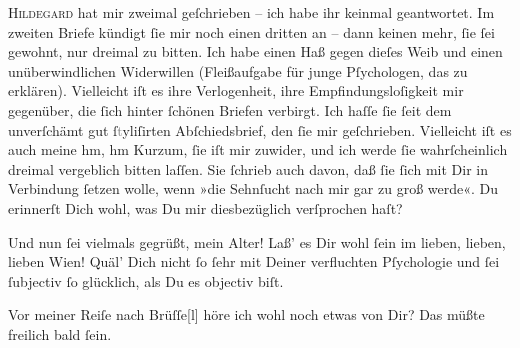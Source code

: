 \pstart
           \textsc{Hildegard} hat mir zweimal geſchrieben –  ich habe
               ihr keinmal geantwortet. Im zweiten Briefe kündigt{ }ſie mir noch einen dritten an –
               dann keinen mehr,{ }ſie{ }ſei gewohnt, nur dreimal zu bitten. Ich habe einen Haß gegen
               dieſes Weib und einen
               unüberwindlichen Widerwillen (Fleißaufgabe für junge Pſychologen, das zu erklären).
                  {\pb}Vielleicht iſt es ihre Verlogenheit, ihre
               Empfindungsloſigkeit mir gegenüber, die{ }ſich hinter{ }ſchönen Briefen verbirgt. Ich
               haſſe{ }ſie{ }ſeit dem unverſchämt gut{ }ſ\textcolor{gray}{t}yliſirten Abſchiedsbrief, den{ }ſie mir geſchrieben. Vielleicht iſt es auch meine {\dotsfour} hm, hm
                  {\dotsfour} Kurzum,{ }ſie iſt mir zuwider, und ich werde{ }ſie
               wahrſcheinlich dreimal vergeblich bitten laſſen. Sie{ }ſchrieb auch davon, daß{ }ſie{ }ſich
               mit Dir in Verbindung{ }ſetzen wolle, wenn »die Sehnſucht nach  mir gar zu groß werde«. Du erinnerſt Dich wohl, was Du mir diesbezüglich
               verſprochen haſt? {\dotsfour}\pend
           
\pstart
           Und nun{ }ſei vielmals gegrüßt, mein Alter! Laß’ es Dir wohl{ }ſein im lieben, lieben,
               lieben Wien! Quäl’ {\pb}Dich nicht{ }ſo{ }ſehr mit Deiner verfluchten
               Pſychologie und{ }ſei{ }ſubjectiv{ }ſo glücklich, als Du es objectiv biſt.\pend
           
\pstart
           Vor meiner Reiſe nach Brüſſe{[}l{]} höre ich wohl noch etwas von Dir? Das müßte freilich bald{ }ſein.\pend
           
